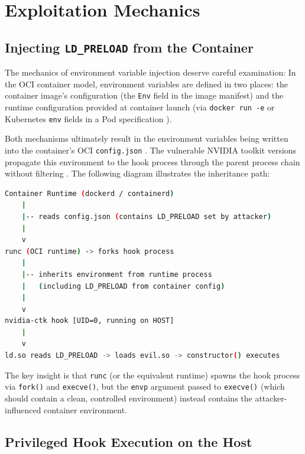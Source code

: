 \section{Exploitation Mechanics}
\label{sec:exploitation}

\subsection{Injecting \texttt{LD\_PRELOAD} from the Container}
\label{subsec:injection}

The mechanics of environment variable injection deserve careful examination: In the OCI container model, environment variables are defined in two places: the container image's configuration (the \texttt{Env} field in the image manifest) \cite{oci_image_spec} and the runtime configuration provided at container launch (via \texttt{docker run -e} or Kubernetes \texttt{env} fields in a Pod specification \cite{k8s_security_docs}).
 
Both mechanisms ultimately result in the environment variables being written into the container's OCI \texttt{config.json} \cite{oci_runtime_spec}. The vulnerable NVIDIA toolkit versions propagate this environment to the hook process through the parent process chain without filtering \cite{nvidia_advisory_2025}. The following diagram illustrates the inheritance path:

\begin{lstlisting}[language=bash, caption={Environment propagation chain from container to privileged hook.}]
Container Runtime (dockerd / containerd)
    |
    |-- reads config.json (contains LD_PRELOAD set by attacker)
    |
    v
runc (OCI runtime) -> forks hook process
    |
    |-- inherits environment from runtime process
    |   (including LD_PRELOAD from container config)
    |
    v
nvidia-ctk hook [UID=0, running on HOST]
    |
    v
ld.so reads LD_PRELOAD -> loads evil.so -> constructor() executes
\end{lstlisting}

The key insight is that \texttt{runc} (or the equivalent runtime) spawns the hook process via \texttt{fork()} and \texttt{execve()}, but the \texttt{envp} argument passed to \texttt{execve()} (which should contain a clean, controlled environment) instead contains the attacker-influenced container environment.

\subsection{Privileged Hook Execution on the Host}
\label{subsec:hook-exec}

